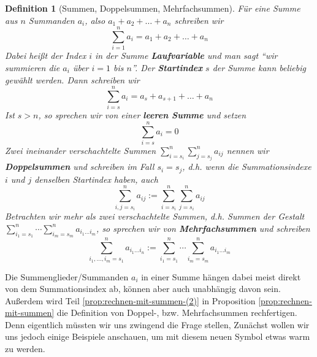\documentclass[11pt,reqno, a4paper]{book}
\renewcommand{\textbf}[1]{{\normalfont\bf #1}}
\theoremstyle{mystyle}
\newtheorem{definition}[theorem]{Definition}
\theoremstyle{definition}
\numberwithin{equation}{chapter}
\begin{document}
\begin{definition}[Summen, Doppelsummen, Mehrfachsummen]
    Für eine Summe aus \(n\) Summanden \(a_i\), also \(a_1 + a_2 + \dots + a_n\) schreiben wir 
    \begin{equation*}
        \sum_{i=1}^n a_i = a_1 + a_2 + \dots + a_n
    \end{equation*}
    Dabei heißt der Index \(i\) in der Summe \textbf{Laufvariable} und man sagt "`wir summieren die \(a_i\) über \(i=1\) bis \(n\)"'. Der \textbf{Startindex} \(s\) der Summe kann beliebig gewählt werden. Dann schreiben wir 
    \begin{equation*}
        \sum_{i=s}^n a_i = a_s + a_{s+1} + \dots + a_n
    \end{equation*}
    Ist \(s> n\), so sprechen wir von einer \textbf{leeren Summe} und setzen 
    \begin{equation*}
        \sum_{i=s}^n a_i = 0
    \end{equation*}
    Zwei ineinander verschachtelte Summen \(\sum_{i=s_i}^n \sum_{j=s_j}^n a_{ij}\) nennen wir \textbf{Doppelsummen} und schreiben im Fall \(s_i = s_j\), d.h. wenn die Summationsindexe \(i\) und \(j\) denselben Startindex haben, auch 
    \begin{equation*}
        \sum_{i,j=s_i}^n a_{ij} := \sum_{i=s_i}^n \sum_{j=s_i}^n a_{ij}
    \end{equation*}
    Betrachten wir mehr als zwei verschachtelte Summen, d.h. Summen der Gestalt \(\sum_{i_1=s_1}^n \cdots \sum_{i_m=s_m}^n a_{i_1\dots i_m}\), so sprechen wir von \textbf{Mehrfachsummen} und schreiben
    \begin{equation*}
        \sum_{i_1, \dots, i_m=s_1}^n a_{i_1 \dots i_n} := \sum_{i_1=s_1}^n \cdots \sum_{i_m=s_m}^n a_{i_1\dots i_m}
    \end{equation*}
\end{definition}
Die Summenglieder/Summanden \(a_i\) in einer Summe hängen dabei meist direkt von dem Summationsindex ab, können aber auch unabhängig davon sein. Außerdem wird Teil \ref{prop:rechnen-mit-summen-(2)} in Proposition \ref{prop:rechnen-mit-summen} die Definition von Doppel-, bzw. Mehrfachsummen rechfertigen. Denn eigentlich müssten wir uns zwingend die Frage stellen,   Zunächst wollen wir uns jedoch einige Beispiele anschauen, um mit diesem neuen Symbol etwas warm zu werden. 
\end{document}
